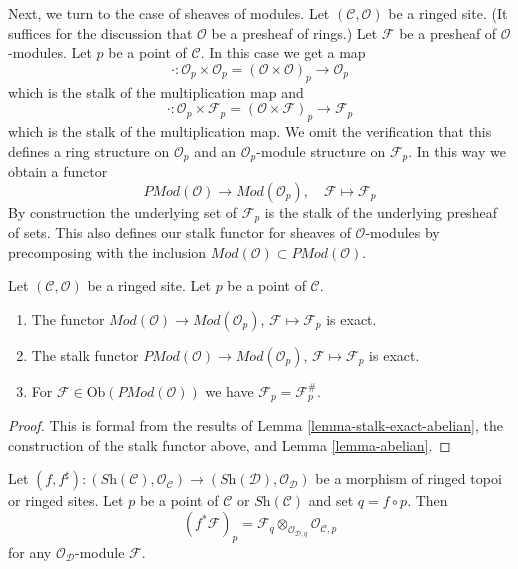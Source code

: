 \noindent
Next, we turn to the case of sheaves of modules.
Let $(\mathcal{C}, \mathcal{O})$ be a ringed site.
(It suffices for the discussion that $\mathcal{O}$ be a presheaf
of rings.)
Let $\mathcal{F}$ be a presheaf of $\mathcal{O}$-modules.
Let $p$ be a point of $\mathcal{C}$. In this case we get a map
$$
\cdot :
\mathcal{O}_p \times \mathcal{O}_p
=
(\mathcal{O} \times \mathcal{O})_p
\longrightarrow
\mathcal{O}_p
$$
which is the stalk of the multiplication map and
$$
\cdot :
\mathcal{O}_p \times \mathcal{F}_p
=
(\mathcal{O} \times \mathcal{F})_p
\longrightarrow
\mathcal{F}_p
$$
which is the stalk of the multiplication map. We omit the verification
that this defines a ring structure on $\mathcal{O}_p$ and an
$\mathcal{O}_p$-module structure on $\mathcal{F}_p$.
In this way we obtain a functor
$$
\textit{PMod}(\mathcal{O}) \longrightarrow \textit{Mod}(\mathcal{O}_p), \quad
\mathcal{F} \longmapsto \mathcal{F}_p
$$
By construction the underlying set of $\mathcal{F}_p$ is the stalk of the
underlying presheaf of sets. This also defines our stalk functor for
sheaves of $\mathcal{O}$-modules by precomposing with the inclusion
$\textit{Mod}(\mathcal{O}) \subset \textit{PMod}(\mathcal{O})$.

\begin{lemma}
\label{lemma-stalk-exact-modules}
Let $(\mathcal{C}, \mathcal{O})$ be a ringed site.
Let $p$ be a point of $\mathcal{C}$.
\begin{enumerate}
\item The functor
$\textit{Mod}(\mathcal{O}) \to \textit{Mod}(\mathcal{O}_p)$,
$\mathcal{F} \mapsto \mathcal{F}_p$ is exact.
\item The stalk functor
$\textit{PMod}(\mathcal{O}) \to \textit{Mod}(\mathcal{O}_p)$,
$\mathcal{F} \mapsto \mathcal{F}_p$
is exact.
\item For $\mathcal{F} \in \text{Ob}(\textit{PMod}(\mathcal{O}))$
we have $\mathcal{F}_p = \mathcal{F}^\#_p$.
\end{enumerate}
\end{lemma}

\begin{proof}
This is formal from the results of
Lemma \ref{lemma-stalk-exact-abelian},
the construction of the stalk functor above, and
Lemma \ref{lemma-abelian}.
\end{proof}

\begin{lemma}
\label{lemma-pullback-stalk}
Let
$(f, f^\sharp) :
(\textit{Sh}(\mathcal{C}), \mathcal{O}_{\mathcal{C}})
\to
(\textit{Sh}(\mathcal{D}), \mathcal{O}_{\mathcal{D}})$
be a morphism of ringed topoi or ringed sites.
Let $p$ be a point of $\mathcal{C}$ or $\textit{Sh}(\mathcal{C})$
and set $q = f \circ p$. Then
$$
(f^*\mathcal{F})_p =
\mathcal{F}_q \otimes_{\mathcal{O}_{\mathcal{D}, q}}
\mathcal{O}_{\mathcal{C}, p}
$$
for any $\mathcal{O}_{\mathcal{D}}$-module $\mathcal{F}$.
\end{lemma}

